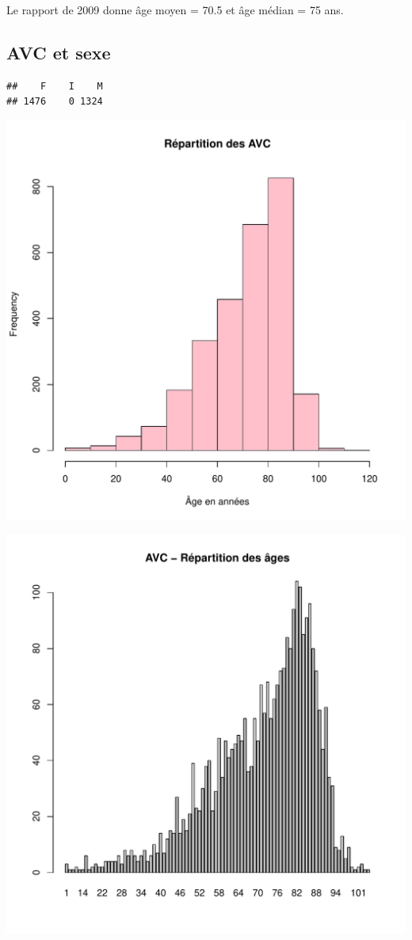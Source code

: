 \documentclass[12pt,english,french,twoside]{book}\usepackage[]{graphicx}\usepackage[]{color}
\makeatletter
\def\maxwidth{ %
  \ifdim\Gin@nat@width>\linewidth
    \linewidth
  \else
    \Gin@nat@width
  \fi
}
\newenvironment{kframe}{%
 \def\at@end@of@kframe{}%
 \ifinner\ifhmode%
  \def\at@end@of@kframe{\end{minipage}}%
  \begin{minipage}{\columnwidth}%
 \fi\fi%
 \def\FrameCommand##1{\hskip\@totalleftmargin \hskip-\fboxsep
 \colorbox{shadecolor}{##1}\hskip-\fboxsep
     \hskip-\linewidth \hskip-\@totalleftmargin \hskip\columnwidth}%
 \MakeFramed {\advance\hsize-\width
   \@totalleftmargin\z@ \linewidth\hsize
   \@setminipage}}%
 {\par\unskip\endMakeFramed%
 \at@end@of@kframe}
\newenvironment{knitrout}{}{} %
\makeatother
\begin{document}
Le rapport de 2009 donne âge moyen = 70.5 et âge médian = 75 ans.

\subsection*{AVC et sexe}
\begin{knitrout}
\color{fgcolor}\begin{kframe}
\begin{verbatim}
##    F    I    M 
## 1476    0 1324
\end{verbatim}
\end{kframe}
\includegraphics[width=\maxwidth]{figure/avc_sexe1} 

\includegraphics[width=\maxwidth]{figure/avc_sexe2} 


\end{knitrout}
\end{document}
